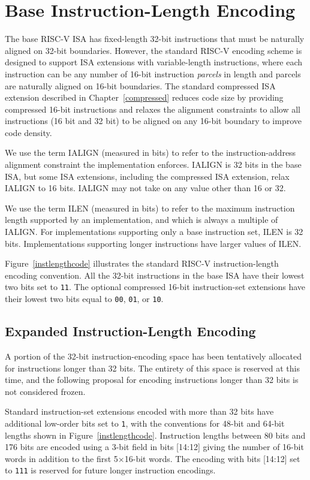 \section{Base Instruction-Length Encoding}

The base RISC-V ISA has fixed-length 32-bit instructions that must be
naturally aligned on 32-bit boundaries.  However, the standard RISC-V
encoding scheme is designed to support ISA extensions with
variable-length instructions, where each instruction can be any number
of 16-bit instruction {\em parcels} in length and parcels are
naturally aligned on 16-bit boundaries.  The standard compressed ISA
extension described in Chapter~\ref{compressed} reduces code size by
providing compressed 16-bit instructions and relaxes the alignment
constraints to allow all instructions (16 bit and 32 bit) to be
aligned on any 16-bit boundary to improve code density.

We use the term IALIGN (measured in bits) to refer to the instruction-address
alignment constraint the implementation enforces.  IALIGN is 32 bits in the
base ISA, but some ISA extensions, including the compressed ISA extension,
relax IALIGN to 16 bits.  IALIGN may not take on any value other than 16 or
32.

We use the term ILEN (measured in bits) to refer to the maximum
instruction length supported by an implementation, and which is always
a multiple of IALIGN.  For implementations supporting only a base
instruction set, ILEN is 32 bits.  Implementations supporting longer
instructions have larger values of ILEN.

Figure~\ref{instlengthcode} illustrates the standard RISC-V
instruction-length encoding convention.  All the 32-bit instructions
in the base ISA have their lowest two bits set to {\tt 11}.  The
optional compressed 16-bit instruction-set extensions have their
lowest two bits equal to {\tt 00}, {\tt 01}, or {\tt 10}.

\subsection*{Expanded Instruction-Length Encoding}

A portion of the 32-bit instruction-encoding space has been tentatively
allocated for instructions longer than 32 bits.  The entirety of this space is
reserved at this time, and the following proposal for encoding instructions
longer than 32 bits is not considered frozen.

Standard instruction-set extensions
encoded with more than 32 bits have additional low-order bits set to {\tt 1},
with the conventions for 48-bit and 64-bit lengths shown in
Figure~\ref{instlengthcode}.  Instruction lengths between 80 bits and 176 bits
are encoded using a 3-bit field in bits [14:12] giving the number of 16-bit
words in addition to the first 5$\times$16-bit words.  The encoding with bits
[14:12] set to {\tt 111} is reserved for future longer instruction encodings.


